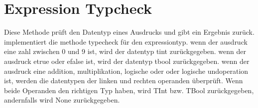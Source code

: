 \documentclass[a4paper, 1ppt]{article}
\begin{document}
\section{Expression Typcheck}
Diese Methode prüft den Datentyp eines Ausdrucks und gibt ein Ergebnis zurück.
implementiert die methode typecheck für den expressiontyp.
wenn der ausdruck eine zahl zwischen 0 und 9 ist, wird der datentyp tint zurückgegeben.
wenn der ausdruck etrue oder efalse ist, wird der datentyp tbool zurückgegeben.
wenn der ausdruck eine addition, multiplikation, logische oder oder logische undoperation ist, werden die datentypen der linken und rechten operanden überprüft.
Wenn beide Operanden den richtigen Typ haben, wird TInt bzw.
TBool zurückgegeben, andernfalls wird None zurückgegeben.
\end{document}
